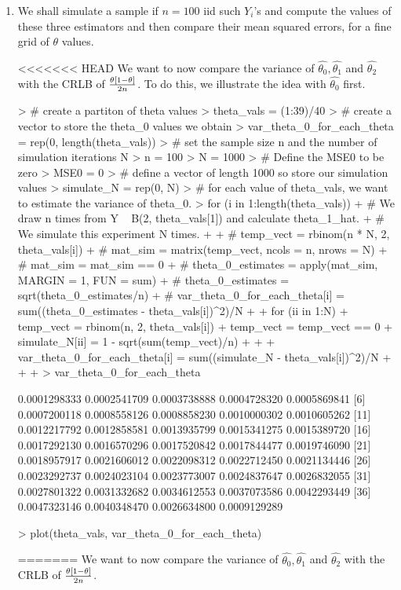 \documentclass[12pt, a4paper]{article}
\begin{document}
\begin{enumerate}[label={\bfseries\arabic*.}]
{}

\item We shall simulate a sample if $n = 100$ iid such $Y_i$’s and compute the values of these three estimators and then compare their mean squared errors, for a fine grid of $\theta$ values.

{\setlength{\leftskip}{3ex}

<<<<<<< HEAD
We want to now compare the variance of $\hat{\theta_0}, \hat{\theta_1}$ and $\hat{\theta_2}$ with the CRLB of $\frac{\theta\left[1 - \theta\right]}{2n}$. To do this, we illustrate the idea with $\hat{\theta_0}$ first. 

\begin{Schunk}
\begin{Sinput}
> # create a partiton of theta values
> theta_vals = (1:39)/40
> # create a vector to store the theta_0 values we obtain
> var_theta_0_for_each_theta = rep(0, length(theta_vals))
> # set the sample size n and the number of simulation iterations N
> n = 100
> N = 1000
> # Define the MSE0 to be zero 
> MSE0 = 0
> # define a vector of length 1000 so store our simulation values
> simulate_N = rep(0, N)
> # for each value of theta_vals, we want to estimate the variance of theta_0. 
> for (i in 1:length(theta_vals)) {
+   # We draw n times from Y ~ B(2, theta_vals[1]) and calculate theta_1_hat. 
+   # We simulate this experiment N times. 
+   
+   # temp_vect = rbinom(n * N, 2, theta_vals[i])
+   # mat_sim = matrix(temp_vect, ncols = n, nrows = N)
+   # mat_sim = mat_sim == 0
+   # theta_0_estimates = apply(mat_sim, MARGIN = 1, FUN = sum)
+   # theta_0_estimates = sqrt(theta_0_estimates/n)
+   # var_theta_0_for_each_theta[i] = sum((theta_0_estimates - theta_vals[i])^2)/N
+   
+   for (ii in 1:N) {
+     temp_vect = rbinom(n, 2, theta_vals[i])
+     temp_vect = temp_vect == 0
+     simulate_N[ii] = 1 - sqrt(sum(temp_vect)/n)
+   }
+   
+   var_theta_0_for_each_theta[i] = sum((simulate_N - theta_vals[i])^2)/N
+   
+   
+ }
> var_theta_0_for_each_theta
\end{Sinput}
\begin{Soutput}
 [1] 0.0001298333 0.0002541709 0.0003738888 0.0004728320 0.0005869841
 [6] 0.0007200118 0.0008558126 0.0008858230 0.0010000302 0.0010605262
[11] 0.0012217792 0.0012858581 0.0013935799 0.0015341275 0.0015389720
[16] 0.0017292130 0.0016570296 0.0017520842 0.0017844477 0.0019746090
[21] 0.0018957917 0.0021606012 0.0022098312 0.0022712450 0.0021134446
[26] 0.0023292737 0.0024023104 0.0023773007 0.0024837647 0.0026832055
[31] 0.0027801322 0.0031332682 0.0034612553 0.0037073586 0.0042293449
[36] 0.0047323146 0.0040348470 0.0026634800 0.0009129289
\end{Soutput}
\begin{Sinput}
> plot(theta_vals, var_theta_0_for_each_theta)
\end{Sinput}
\end{Schunk}
=======
We want to now compare the variance of $\hat{\theta_0}, \hat{\theta_1}$ and $\hat{\theta_2}$ with the CRLB of $\frac{\theta\left[1 - \theta\right]}{2n}$. 

}
\end{enumerate}
\end{document}
